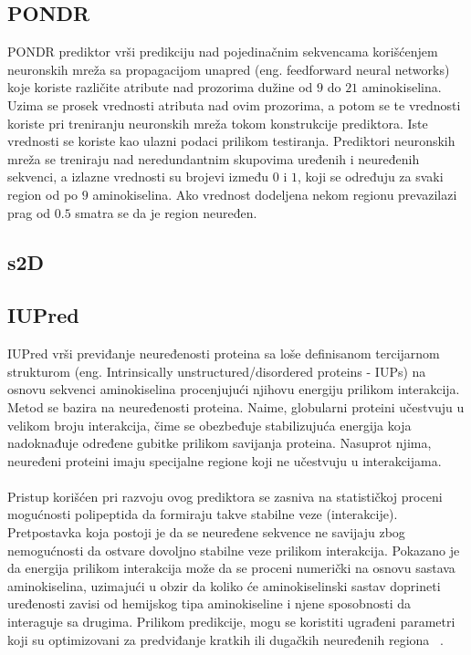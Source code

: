 \subsection{PONDR}
PONDR prediktor vrši predikciju nad pojedinačnim sekvencama korišćenjem neuronskih mreža sa propagacijom unapred (eng. feedforward neural networks) koje koriste različite atribute nad prozorima dužine od $9$ do $21$ aminokiselina. Uzima se prosek vrednosti atributa nad ovim prozorima, a potom se te vrednosti koriste pri treniranju neuronskih mreža tokom konstrukcije prediktora. Iste vrednosti se koriste kao ulazni podaci prilikom testiranja. Prediktori neuronskih mreža se treniraju nad neredundantnim skupovima uređenih i neuređenih sekvenci, a izlazne vrednosti su brojevi između $0$ i $1$, koji se određuju za svaki region od po $9$ aminokiselina. Ako vrednost dodeljena nekom regionu prevazilazi prag od $0.5$ smatra se da je region neuređen.



\subsection{s2D}


\subsection{IUPred}
IUPred vrši previđanje neuređenosti proteina sa loše definisanom tercijarnom strukturom (eng. Intrinsically unstructured/disordered proteins - IUPs) na osnovu sekvenci aminokiselina procenjujući njihovu energiju prilikom interakcija. Metod se bazira na neuređenosti proteina. Naime, globularni proteini učestvuju u velikom broju interakcija, čime se obezbeđuje stabilizujuća energija koja nadoknađuje određene gubitke prilikom savijanja proteina. Nasuprot njima, neuređeni proteini imaju specijalne regione koji ne učestvuju u   interakcijama.\\\\

Pristup korišćen pri razvoju ovog prediktora se zasniva na statističkoj proceni mogućnosti polipeptida da formiraju takve stabilne veze (interakcije). Pretpostavka koja postoji je da se neuređene sekvence ne savijaju zbog nemogućnosti da ostvare dovoljno stabilne veze prilikom interakcija. Pokazano  je da energija prilikom interakcija može da se proceni numerički na osnovu sastava aminokiselina, uzimajući u obzir da koliko će aminokiselinski sastav doprineti uređenosti zavisi od hemijskog tipa aminokiseline i njene sposobnosti da interaguje sa drugima. Prilikom predikcije, mogu se koristiti ugrađeni parametri koji su optimizovani za predviđanje kratkih ili dugačkih neuređenih regiona ~\cite{IUPred, IUPred1, IUPred2, IUPred3}.


